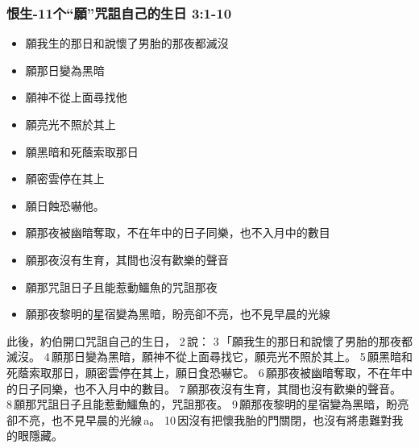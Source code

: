 \subsubsection{恨生-11个“願”咒詛自己的生日 3:1-10}
\begin{itemize}
\itemsep-.45em  
\item 願我生的那日和說懷了男胎的那夜都滅沒
\item 願那日變為黑暗
\item 願神不從上面尋找他
\item 願亮光不照於其上
\item 願黑暗和死蔭索取那日 
\item 願密雲停在其上
\item 願日蝕恐嚇他。
\item 願那夜被幽暗奪取，不在年中的日子同樂，也不入月中的數目
\item 願那夜沒有生育，其間也沒有歡樂的聲音
\item 願那咒詛日子且能惹動鱷魚的咒詛那夜
\item 願那夜黎明的星宿變為黑暗，盼亮卻不亮，也不見早晨的光線
\end{itemize}
此後，約伯開口咒詛自己的生日， 2 說： 3 「願我生的那日和說懷了男胎的那夜都滅沒。 4 願那日變為黑暗，願神不從上面尋找它，願亮光不照於其上。 5 願黑暗和死蔭索取那日，願密雲停在其上，願日食恐嚇它。 6 願那夜被幽暗奪取，不在年中的日子同樂，也不入月中的數目。 7 願那夜沒有生育，其間也沒有歡樂的聲音。 8 願那咒詛日子且能惹動鱷魚的，咒詛那夜。 9 願那夜黎明的星宿變為黑暗，盼亮卻不亮，也不見早晨的光線 a。 10 因沒有把懷我胎的門關閉，也沒有將患難對我的眼隱藏。



